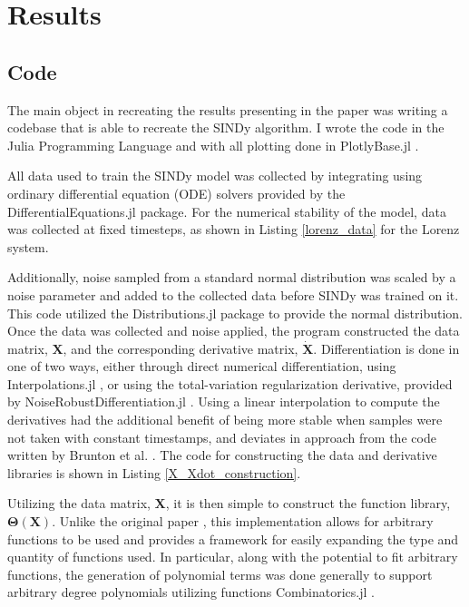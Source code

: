 \documentclass[10pt]{paper}
\begin{document}
\section{Results} \label{sec:results}
\subsection{Code}
The main object in recreating the results presenting in the paper was writing a codebase that is able to recreate the SINDy algorithm. 
I wrote the code in the Julia Programming Language \cite{julia} and with all plotting done in PlotlyBase.jl \cite{PlotlyBase.jl}.

All data used to train the SINDy model was collected by integrating using ordinary differential equation (ODE) solvers provided by the DifferentialEquations.jl \cite{rackauckas2017differentialequations} package.
For the numerical stability of the model, data was collected at fixed timesteps, as shown in Listing \ref{lorenz_data} for the Lorenz system.


Additionally, noise sampled from a standard normal distribution was scaled by a noise parameter and added to the collected data before SINDy was trained on it. This code utilized the Distributions.jl \cite{JSSv098i16}\cite{Distributions.jl-2019} package to provide the normal distribution. 
Once the data was collected and noise applied, the program constructed the data matrix, $\mathbf X$, and the corresponding derivative matrix, $\mathbf {\dot X}$. Differentiation is done in one of two ways, either through direct numerical differentiation, using Interpolations.jl \cite{Interpolations.jl}, or using the total-variation regularization derivative, provided by NoiseRobustDifferentiation.jl \cite{chartrand2011numerical}\cite{NoiseRobustDifferentiation.jl}.
Using a linear interpolation to compute the derivatives had the additional benefit of being more stable when samples were not taken with constant timestamps, and deviates in approach from the code written by Brunton et al. \cite{sindy}. 
The code for constructing the data and derivative libraries is shown in Listing \ref{X_Xdot_construction}. 


Utilizing the data matrix, $\mathbf X$, it is then simple to construct the function library, $\mathbf \Theta(\mathbf X)$.
Unlike the original paper \cite{sindy}, this implementation allows for arbitrary functions to be used and provides a framework for easily expanding the type and quantity of functions used. 
In particular, along with the potential to fit arbitrary functions, the generation of polynomial terms was done generally to support arbitrary degree polynomials utilizing functions Combinatorics.jl \cite{Combinatorics.jl}.
\end{document}
